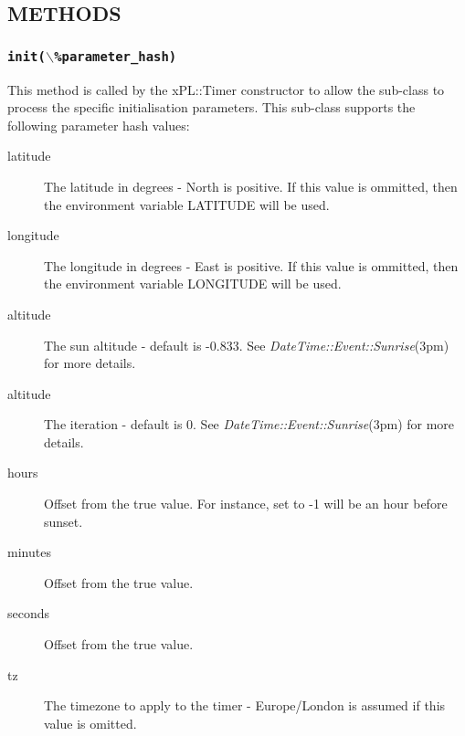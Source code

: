 \subsection*{METHODS\label{xPL::Timer::sunset_METHODS}}
\subsubsection*{\texttt{init($\backslash$\%parameter\_hash)}\label{xPL::Timer::sunset_init_backslash_parameter_hash_}}


This method is called by the xPL::Timer constructor to allow the
sub-class to process the specific initialisation parameters.  This
sub-class supports the following parameter hash values:

\begin{description}

\item[{latitude}] \mbox{}

The latitude in degrees - North is positive.  If this value is
ommitted, then the environment variable LATITUDE will be used.


\item[{longitude}] \mbox{}

The longitude in degrees - East is positive.  If this value is
ommitted, then the environment variable LONGITUDE will be used.


\item[{altitude}] \mbox{}

The sun altitude - default is -0.833.  See \emph{DateTime::Event::Sunrise}(3pm)
for more details.


\item[{altitude}] \mbox{}

The iteration - default is 0.  See \emph{DateTime::Event::Sunrise}(3pm)
for more details.


\item[{hours}] \mbox{}

Offset from the true value.  For instance, set to -1 will be an hour
before sunset.


\item[{minutes}] \mbox{}

Offset from the true value.


\item[{seconds}] \mbox{}

Offset from the true value.


\item[{tz}] \mbox{}

The timezone to apply to the timer - Europe/London is assumed if this
value is omitted.

\end{description}
